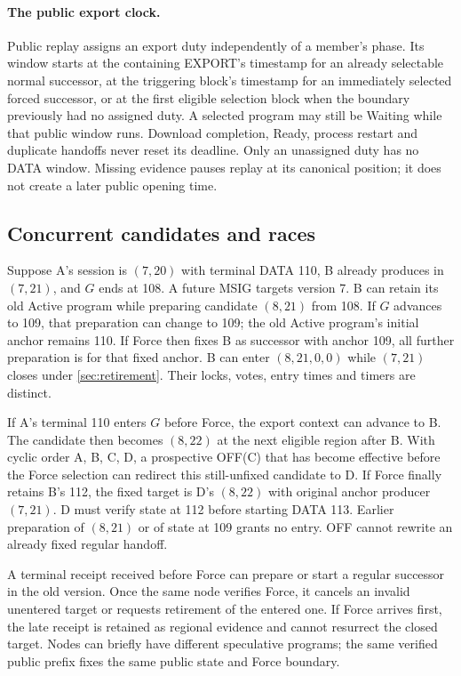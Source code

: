 \paragraph{The public export clock.}
Public replay assigns an export duty independently of a member's
phase. Its window starts at the containing EXPORT's timestamp for
an already selectable normal successor, at the triggering block's
timestamp for an immediately selected forced successor, or at the
first eligible selection block when the boundary previously had no
assigned duty. A selected program may still be Waiting while that
public window runs. Download completion, Ready, process restart and
duplicate handoffs never reset its deadline. Only an unassigned duty
has no DATA window. Missing evidence pauses replay at its canonical
position; it does not create a later public opening time.

\subsection{Concurrent candidates and races}
\label{sec:runtime-races}
Suppose A's session is $(7,20)$ with terminal DATA 110, B already
produces in $(7,21)$, and $G$ ends at 108. A future MSIG targets
version 7. B can retain its old Active program while preparing
candidate $(8,21)$ from 108. If $G$ advances to 109, that preparation
can change to 109; the old Active program's initial anchor remains
110. If Force then fixes B as successor with anchor 109, all further
preparation is for that fixed anchor. B can enter $(8,21,0,0)$ while
$(7,21)$ closes under \cref{sec:retirement}. Their locks, votes,
entry times and timers are distinct.

If A's terminal 110 enters $G$ before Force, the export context can
advance to B. The candidate then becomes $(8,22)$ at the next eligible
region after B. With cyclic order A, B, C, D, a prospective OFF(C)
that has become effective before the Force selection can redirect
this still-unfixed candidate to D. If Force finally retains B's 112,
the fixed target is D's $(8,22)$ with original anchor producer
$(7,21)$. D must verify state at 112 before starting DATA 113.
Earlier preparation of $(8,21)$ or of state at 109 grants no entry.
OFF cannot rewrite an already fixed regular handoff.

A terminal receipt received before Force can prepare or start a
regular successor in the old version. Once the same node verifies
Force, it cancels an invalid unentered target or requests retirement
of the entered one. If Force arrives first, the late receipt is
retained as regional evidence and cannot resurrect the closed target.
Nodes can briefly have different speculative programs; the same
verified public prefix fixes the same public state and Force boundary.

